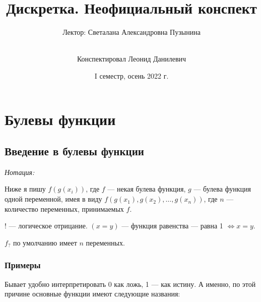 \documentclass[a4paper]{report}
\date{I семестр, осень 2022 г.}
\title{Дискретка. Неофициальный конспект}
\author{Лектор: Светалана Александровна Пузынина \and \\ Конспектировал Леонид Данилевич}
\begin{document}
    \maketitle
    \tableofcontents
    \newpage
    \setcounter{lection}{0}


    \chapter{Булевы функции}


    \section{Введение в булевы функции}

    \textit{Нотация:}

    Ниже я пишу $f(g(x_i))$, где $f$ --- некая булева функция, $g$ --- булева функция одной переменной, имея в виду $f(g(x_1), g(x_2), \dots, g(x_n))$, где $n$ --- количество переменных, принимаемых $f$.

    $!$ --- логическое отрицание. $(x = y)$ --- функция равенства --- равна 1 $\iff x = y$.

    $f_?$ по умолчанию имеет $n$ переменных.
    \ok

    \subsection{Примеры}
    Бывает удобно интерпретировать 0 как ложь, 1 --- как истину.
    А именно, по этой причине основные функции имеют следующие названия:
\end{document}
